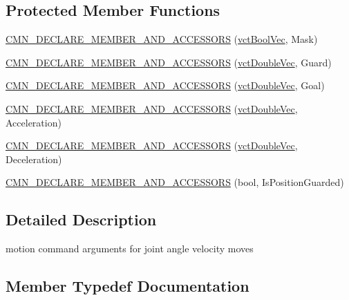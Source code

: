 \subsection*{Protected Member Functions}
\begin{DoxyCompactItemize}
\item 
\hyperlink{classprm_velocity_joint_set_a73e860fe288cb298d1d4f25b80cd5f02}{C\+M\+N\+\_\+\+D\+E\+C\+L\+A\+R\+E\+\_\+\+M\+E\+M\+B\+E\+R\+\_\+\+A\+N\+D\+\_\+\+A\+C\+C\+E\+S\+S\+O\+R\+S} (\hyperlink{vct_dynamic_vector_types_8h_aeb2237c134aee3769198bd9d55c8a9e0}{vct\+Bool\+Vec}, Mask)
\item 
\hyperlink{classprm_velocity_joint_set_a42540912b2e05179208ef22f45ae1a4a}{C\+M\+N\+\_\+\+D\+E\+C\+L\+A\+R\+E\+\_\+\+M\+E\+M\+B\+E\+R\+\_\+\+A\+N\+D\+\_\+\+A\+C\+C\+E\+S\+S\+O\+R\+S} (\hyperlink{vct_dynamic_vector_types_8h_ade4b3068c86fb88f41af2e5187e491c2}{vct\+Double\+Vec}, Guard)
\item 
\hyperlink{classprm_velocity_joint_set_a2c8bb13d09ce37206c4d0172a10f5840}{C\+M\+N\+\_\+\+D\+E\+C\+L\+A\+R\+E\+\_\+\+M\+E\+M\+B\+E\+R\+\_\+\+A\+N\+D\+\_\+\+A\+C\+C\+E\+S\+S\+O\+R\+S} (\hyperlink{vct_dynamic_vector_types_8h_ade4b3068c86fb88f41af2e5187e491c2}{vct\+Double\+Vec}, Goal)
\item 
\hyperlink{classprm_velocity_joint_set_aef2f30ae6d30e8f778632f6a695e2297}{C\+M\+N\+\_\+\+D\+E\+C\+L\+A\+R\+E\+\_\+\+M\+E\+M\+B\+E\+R\+\_\+\+A\+N\+D\+\_\+\+A\+C\+C\+E\+S\+S\+O\+R\+S} (\hyperlink{vct_dynamic_vector_types_8h_ade4b3068c86fb88f41af2e5187e491c2}{vct\+Double\+Vec}, Acceleration)
\item 
\hyperlink{classprm_velocity_joint_set_a021585bd893928f56766efd998656591}{C\+M\+N\+\_\+\+D\+E\+C\+L\+A\+R\+E\+\_\+\+M\+E\+M\+B\+E\+R\+\_\+\+A\+N\+D\+\_\+\+A\+C\+C\+E\+S\+S\+O\+R\+S} (\hyperlink{vct_dynamic_vector_types_8h_ade4b3068c86fb88f41af2e5187e491c2}{vct\+Double\+Vec}, Deceleration)
\item 
\hyperlink{classprm_velocity_joint_set_a49e79113209d73cc0daca3a18b7dd7cd}{C\+M\+N\+\_\+\+D\+E\+C\+L\+A\+R\+E\+\_\+\+M\+E\+M\+B\+E\+R\+\_\+\+A\+N\+D\+\_\+\+A\+C\+C\+E\+S\+S\+O\+R\+S} (bool, Is\+Position\+Guarded)
\end{DoxyCompactItemize}


\subsection{Detailed Description}
motion command arguments for joint angle velocity moves 

\subsection{Member Typedef Documentation}
\hypertarget{classprm_velocity_joint_set_a8cd5faa63ec2682c605ca6c6e1248f3a}{}
